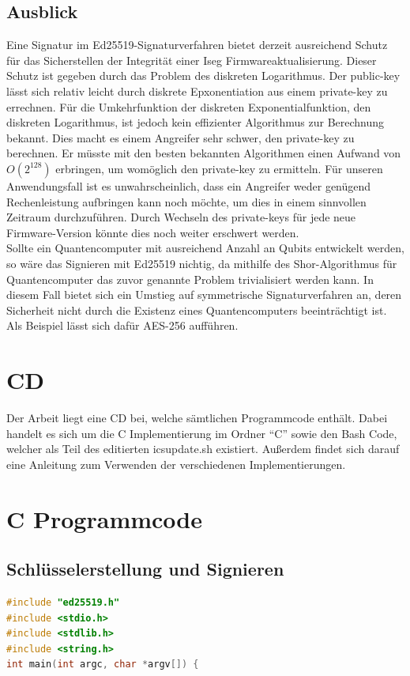 \documentclass[thesis=bachelor,faculty=cb]{hsmw-thesis}
\begin{document}
{\section{Ausblick}
Eine Signatur im Ed25519-Signaturverfahren bietet derzeit ausreichend Schutz für das Sicherstellen der Integrität einer Iseg Firmwareaktualisierung. Dieser Schutz ist gegeben durch das Problem des diskreten Logarithmus. Der public-key lässt sich relativ leicht durch diskrete Epxonentiation aus einem private-key zu errechnen. Für die Umkehrfunktion der diskreten Exponentialfunktion, den diskreten Logarithmus, ist jedoch kein effizienter Algorithmus zur Berechnung bekannt. Dies macht es einem Angreifer sehr schwer, den private-key zu berechnen. Er müsste mit den besten bekannten Algorithmen einen Aufwand von \begin{math}O(2^{128})\end{math} \cite[Vgl. S.1]{ed25519_paper} erbringen, um womöglich den private-key zu ermitteln. Für unseren Anwendungsfall ist es unwahrscheinlich, dass ein Angreifer weder genügend Rechenleistung aufbringen kann noch möchte, um dies in einem sinnvollen Zeitraum durchzuführen. Durch Wechseln des private-keys für jede neue Firmware-Version könnte dies noch weiter erschwert werden.
\\[1cm]
Sollte ein Quantencomputer mit ausreichend Anzahl an Qubits entwickelt werden, so wäre das Signieren mit Ed25519 nichtig, da mithilfe des Shor-Algorithmus \cite{SHOR} für Quantencomputer das zuvor genannte Problem trivialisiert werden kann. In diesem Fall bietet sich ein Umstieg auf symmetrische Signaturverfahren an, deren Sicherheit nicht durch die Existenz eines Quantencomputers beeinträchtigt ist. Als Beispiel lässt sich dafür AES-256 aufführen.

\appendix %
\chapter{CD}
Der Arbeit liegt eine CD bei, welche sämtlichen Programmcode enthält. Dabei handelt es sich um die C Implementierung im Ordner \enquote{C} sowie den Bash Code, welcher als Teil des editierten icsupdate.sh existiert. Außerdem findet sich darauf eine Anleitung zum Verwenden der verschiedenen Implementierungen.
\chapter{C Programmcode}
\section{Schlüsselerstellung und Signieren}
\begin{lstlisting}[language=C]
#include "ed25519.h"
#include <stdio.h>
#include <stdlib.h>
#include <string.h>
int main(int argc, char *argv[]) {


\end{lstlisting}}
\end{document}
